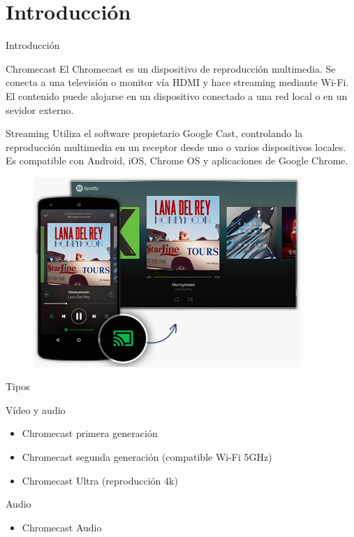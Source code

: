 \section{Introducción}

\begin{frame}{Introducción}
	\begin{block}{Chromecast}
	El Chromecast es un dispositivo de reproducción multimedia. Se conecta a una televisión o monitor vía HDMI y hace streaming mediante Wi-Fi.
	El contenido puede alojarse en un dispositivo conectado a una red local o en un sevidor externo.
	\end{block}
	
	\begin{block}{Streaming}
	Utiliza el software propietario Google Cast, controlando la reproducción multimedia en un receptor desde uno o varios dispositivos locales.
	Es compatible con Android, iOS, Chrome OS y aplicaciones de
	Google Chrome.
	\end{block}
\end{frame}


\begin{frame}
	\begin{figure}[H]
		\centering
		\includegraphics[width=0.9\textwidth]{./Imagenes/spotify-chromecast.png}
	\end{figure}
\end{frame}


\begin{frame}{Tipos}
	\begin{exampleblock}{Vídeo y audio}
		\begin{itemize}
			\item Chromecast primera generación
			\item Chromecast segunda generación (compatible Wi-Fi 5GHz)
			\item Chromecast Ultra (reproducción 4k)
		\end{itemize}
	\end{exampleblock}
	
	\begin{exampleblock}{Audio}
		\begin{itemize}
			\item  Chromecast Audio
		\end{itemize}
	\end{exampleblock}
\end{frame}


